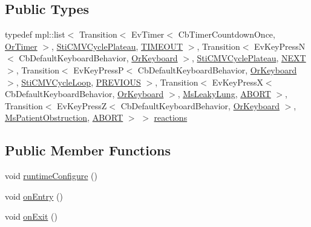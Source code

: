 \subsection*{Public Types}
\begin{DoxyCompactItemize}
\item 
typedef mpl\+::list$<$ Transition$<$ Ev\+Timer$<$ Cb\+Timer\+Countdown\+Once, \hyperlink{classsm__respira__1_1_1OrTimer}{Or\+Timer} $>$, \hyperlink{structsm__respira__1_1_1cmv__cycle__inner__states_1_1StiCMVCyclePlateau}{Sti\+C\+M\+V\+Cycle\+Plateau}, \hyperlink{structsm__respira__1_1_1cmv__cycle__inner__states_1_1StiCMVCycleInspire_1_1TIMEOUT}{T\+I\+M\+E\+O\+UT} $>$, Transition$<$ Ev\+Key\+PressN$<$ Cb\+Default\+Keyboard\+Behavior, \hyperlink{classsm__respira__1_1_1OrKeyboard}{Or\+Keyboard} $>$, \hyperlink{structsm__respira__1_1_1cmv__cycle__inner__states_1_1StiCMVCyclePlateau}{Sti\+C\+M\+V\+Cycle\+Plateau}, \hyperlink{structsm__respira__1_1_1cmv__cycle__inner__states_1_1StiCMVCycleInspire_1_1NEXT}{N\+E\+XT} $>$, Transition$<$ Ev\+Key\+PressP$<$ Cb\+Default\+Keyboard\+Behavior, \hyperlink{classsm__respira__1_1_1OrKeyboard}{Or\+Keyboard} $>$, \hyperlink{structsm__respira__1_1_1cmv__cycle__inner__states_1_1StiCMVCycleLoop}{Sti\+C\+M\+V\+Cycle\+Loop}, \hyperlink{structsm__respira__1_1_1cmv__cycle__inner__states_1_1StiCMVCycleInspire_1_1PREVIOUS}{P\+R\+E\+V\+I\+O\+US} $>$, Transition$<$ Ev\+Key\+PressX$<$ Cb\+Default\+Keyboard\+Behavior, \hyperlink{classsm__respira__1_1_1OrKeyboard}{Or\+Keyboard} $>$, \hyperlink{classsm__respira__1_1_1MsLeakyLung}{Ms\+Leaky\+Lung}, \hyperlink{classABORT}{A\+B\+O\+RT} $>$, Transition$<$ Ev\+Key\+PressZ$<$ Cb\+Default\+Keyboard\+Behavior, \hyperlink{classsm__respira__1_1_1OrKeyboard}{Or\+Keyboard} $>$, \hyperlink{classsm__respira__1_1_1MsPatientObstruction}{Ms\+Patient\+Obstruction}, \hyperlink{classABORT}{A\+B\+O\+RT} $>$ $>$ \hyperlink{structsm__respira__1_1_1cmv__cycle__inner__states_1_1StiCMVCycleInspire_a47f067e4ae99b039d4a79cf2bb1e1aef}{reactions}
\end{DoxyCompactItemize}
\subsection*{Public Member Functions}
\begin{DoxyCompactItemize}
\item 
void \hyperlink{structsm__respira__1_1_1cmv__cycle__inner__states_1_1StiCMVCycleInspire_a3a8408df4324cbfd0512b8d416085c52}{runtime\+Configure} ()
\item 
void \hyperlink{structsm__respira__1_1_1cmv__cycle__inner__states_1_1StiCMVCycleInspire_a7ea84a07cb161a9963b7a0ef862d55da}{on\+Entry} ()
\item 
void \hyperlink{structsm__respira__1_1_1cmv__cycle__inner__states_1_1StiCMVCycleInspire_a4702ba76b104cc5b69ba9a42b85509d6}{on\+Exit} ()
\end{DoxyCompactItemize}
